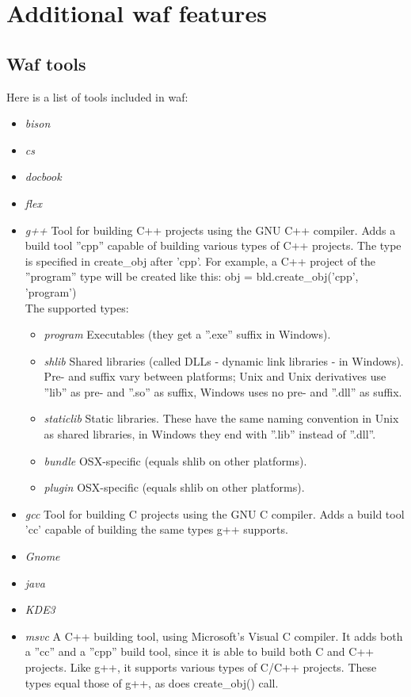 \documentclass[a4,10pt]{article}
\begin{document}
\section{Additional waf features}

\subsection{Waf tools}
Here is a list of tools included in waf:
\begin{itemize}
	\item \emph{bison}
	\item \emph{cs}
	\item \emph{docbook}
	\item \emph{flex}
	\item \emph{g++}
		Tool for building C++ projects using the GNU C++ compiler. Adds a build tool ''cpp'' capable of building various types of C++ projects. The type is specified in create\_obj after 'cpp'. For example, a C++ project of the ''program'' type will be created like this: obj = bld.create\_obj('cpp', 'program')\\
		The supported types:
		\begin{itemize}
			\item \emph{program} Executables (they get a ''.exe'' suffix in Windows).
			\item \emph{shlib} Shared libraries (called DLLs - dynamic link libraries - in Windows). Pre- and suffix vary between platforms; Unix and Unix derivatives use ''lib'' as pre- and ''.so'' as suffix, Windows uses no pre- and ''.dll'' as suffix.
			\item \emph{staticlib} Static libraries. These have the same naming convention in Unix as shared libraries, in Windows they end with ''.lib'' instead of ''.dll''.
			\item \emph{bundle} OSX-specific (equals shlib on other platforms).
			\item \emph{plugin} OSX-specific (equals shlib on other platforms).
		\end{itemize}
	\item \emph{gcc}
		Tool for building C projects using the GNU C compiler. Adds a build tool 'cc' capable of building the same types g++ supports.
	\item \emph{Gnome}
	\item \emph{java}
	\item \emph{KDE3}
	\item \emph{msvc}
		A C++ building tool, using Microsoft's Visual C compiler. It adds both a ''cc'' and a ''cpp'' build tool, since it is able to build both C and C++ projects. Like g++, it supports various types of C/C++ projects. These types equal those of g++, as does create\_obj() call.\\

\end{itemize}
\end{document}
